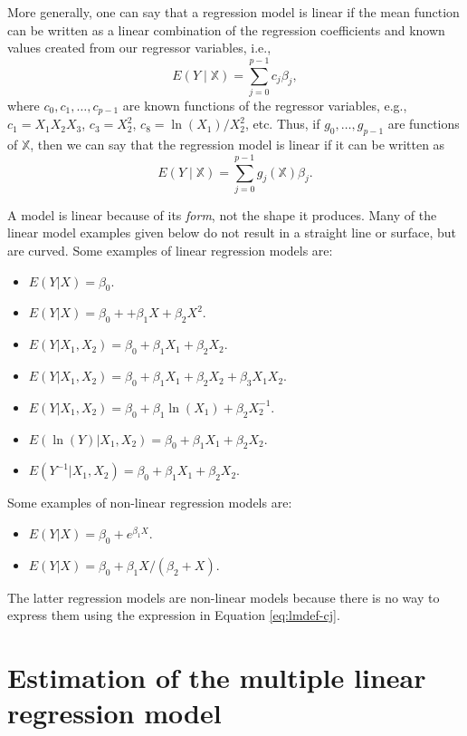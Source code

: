 \documentclass[
]{book}
\providecommand{\tightlist}{%
  \setlength{\itemsep}{0pt}\setlength{\parskip}{0pt}}
\theoremstyle{definition}
\theoremstyle{definition}
\theoremstyle{definition}
\theoremstyle{definition}
\theoremstyle{remark}
\begin{document}
More generally, one can say that a regression model is linear if the mean function can be written as a linear combination of the regression coefficients and known values created from our regressor variables, i.e.,
\[
E(Y \mid \mathbb{X}) = \sum_{j=0}^{p-1} c_j \beta_j, \label{eq:lmdef-cj}
\]
where \(c_0, c_1, \ldots, c_{p-1}\) are known functions of
the regressor variables, e.g., \(c_1 = X_1 X_2 X_3\), \(c_3 = X_2^2\),
\(c_8 = \ln(X_1)/X_2^2\), etc. Thus, if \(g_0,\ldots,g_{p-1}\) are functions of \(\mathbb{X}\), then we can say that the regression model is linear if
it can be written as
\[
E(Y\mid \mathbb{X}) = \sum_{j=0}^{p-1} g_j(\mathbb{X})\beta_j.
\]

A model is linear because of its \emph{form}, not the shape it produces. Many of the linear model examples given below do not result in a straight line or surface, but are curved. Some examples of linear regression models are:

\begin{itemize}
\tightlist
\item
  \(E(Y|X) = \beta_0\).
\item
  \(E(Y|X) = \beta_0 + +\beta_1 X + \beta_2 X^2\).
\item
  \(E(Y|X_1, X_2) = \beta_0 + \beta_1 X_1 + \beta_2 X_2\).
\item
  \(E(Y|X_1, X_2) = \beta_0 + \beta_1 X_1 + \beta_2 X_2 + \beta_3 X_1 X_2\).
\item
  \(E(Y|X_1, X_2) = \beta_0 + \beta_1 \ln(X_1) + \beta_2 X_2^{-1}\).
\item
  \(E(\ln(Y)|X_1, X_2) = \beta_0 + \beta_1 X_1 + \beta_2 X_2\).
\item
  \(E(Y^{-1}|X_1, X_2) = \beta_0 + \beta_1 X_1 + \beta_2 X_2\).
\end{itemize}

Some examples of non-linear regression models are:

\begin{itemize}
\tightlist
\item
  \(E(Y|X) = \beta_0 + e^{\beta_1 X}\).
\item
  \(E(Y|X) = \beta_0 + \beta_1 X/(\beta_2 + X)\).
\end{itemize}

The latter regression models are non-linear models because there is no way to express them using the expression in Equation \eqref{eq:lmdef-cj}.

\hypertarget{estimation-of-the-multiple-linear-regression-model}{%
\section{Estimation of the multiple linear regression model}\label{estimation-of-the-multiple-linear-regression-model}}
\end{document}

